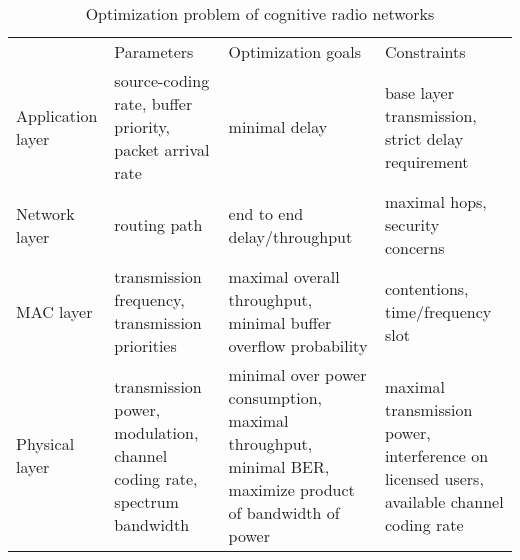 

%

\begin{sidewaystable}
\centering
\begin{tabular}{|L{4cm}|C{5cm}|C{5cm}|C{5cm}|}
\hline 
 & Parameters & Optimization goals & Constraints \\ 
\hhline{|=|=|=|=|}
Application layer & source-coding rate, buffer priority, packet arrival rate & minimal delay & base layer transmission, strict delay requirement \\ 
\hline 
Network layer & routing path & end to end delay/throughput & maximal hops, security concerns \\ 
\hline 
MAC layer & transmission frequency, transmission priorities & maximal overall throughput, minimal buffer overflow probability & contentions, time/frequency slot \\ 
\hline
Physical layer & transmission power, modulation, channel coding rate, spectrum bandwidth & minimal over power consumption, maximal throughput, minimal BER, maximize product of bandwidth of power~\cite{tachwali_opt_bandwidth_power_2013} & maximal transmission power, interference on licensed users, available channel coding rate \\ 
\hline
\end{tabular} 
\caption{Optimization problem of cognitive radio networks}
\label{opt_table} 
\end{sidewaystable}




